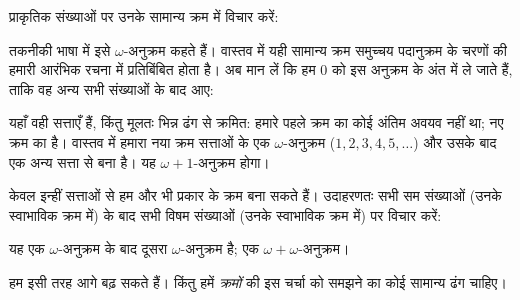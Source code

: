 \documentclass[../../../include/open-logic-section]{subfiles}
\begin{document}

प्राकृतिक संख्याओं पर उनके सामान्य क्रम में विचार करें:
\begin{center}
\end{center}
तकनीकी भाषा में इसे $\omega$-अनुक्रम कहते हैं। वास्तव में यही सामान्य क्रम
समुच्चय पदानुक्रम के चरणों की हमारी आरंभिक रचना में प्रतिबिंबित होता है। अब
मान लें कि हम $0$ को इस अनुक्रम के अंत में ले जाते हैं, ताकि वह अन्य सभी
संख्याओं के बाद आए:
\begin{center}
\end{center}
यहाँ वही सत्ताएँ हैं, किंतु मूलतः भिन्न ढंग से क्रमित: हमारे पहले क्रम का
कोई अंतिम अवयव नहीं था; नए क्रम का है। वास्तव में हमारा नया क्रम सत्ताओं के
एक $\omega$-अनुक्रम ($1, 2, 3, 4, 5, \ldots$) और उसके बाद एक अन्य सत्ता
से बना है। यह $\omega+1$-अनुक्रम होगा।

केवल इन्हीं सत्ताओं से हम और भी प्रकार के क्रम बना सकते हैं। उदाहरणतः सभी
सम संख्याओं (उनके स्वाभाविक क्रम में) के बाद सभी विषम संख्याओं (उनके
स्वाभाविक क्रम में) पर विचार करें:
\begin{center}
\end{center}
यह एक $\omega$-अनुक्रम के बाद दूसरा $\omega$-अनुक्रम है; एक
$\omega+\omega$-अनुक्रम।

हम इसी तरह आगे बढ़ सकते हैं। किंतु हमें \emph{क्रमों} की इस चर्चा को समझने
का कोई सामान्य ढंग चाहिए।
\end{document}
